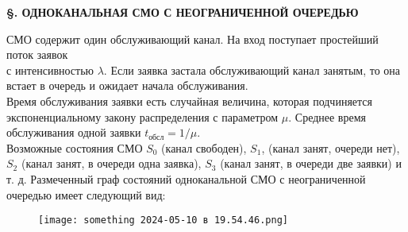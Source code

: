 \documentclass{article}
\begin{document}
\begin{center}
\textbf{\S {}.  ОДНОКАНАЛЬНАЯ СМО С НЕОГРАНИЧЕННОЙ ОЧЕРЕДЬЮ}
\end{center}


 
\indent СМО содержит один обслуживающий канал.  На вход поступает простейший поток заявок\\  с интенсивностью $\lambda$.  Если заявка застала обслуживающий  канал занятым, то она встает в очередь и ожидает начала обслуживания. \\ 
\indent Время  обслуживания  заявки  есть  случайная  величина,  которая подчиняется  экспоненциальному закону распределения  с  параметром $\mu$. Среднее время обслуживания одной заявки $t_{\text{обсл}} = 1/\mu$. \\ \indent
Возможные состояния СМО $S_0$ (канал свободен), $S_1$, (канал занят, очереди нет), $S_2$ (канал занят, в очереди одна заявка), $S_3$ (канал занят, в очереди две заявки) и т. д. Размеченный  граф состояний одноканальной  СМО с неограниченной очередью имеет следующий вид:
\begin{figure}[h] 
\centering
\texttt{[image: something 2024-05-10 в 19.54.46.png]}
\label{fig:my_label}
\end{figure} 
\end{document}
